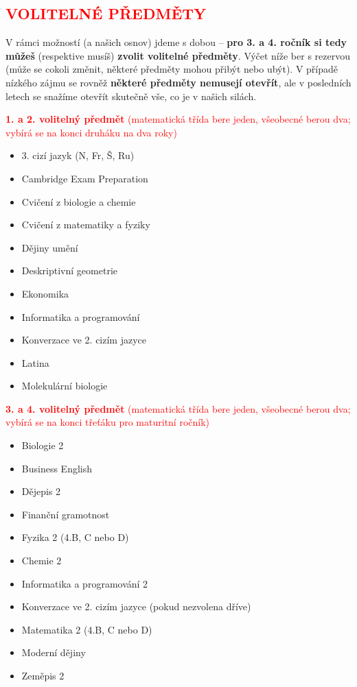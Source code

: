 \documentclass{article}
\newcommand{\podnadpis}[1]{
  \subsection*{\textcolor{red}{#1}}
}
\begin{document}
\newpage

\podnadpis{VOLITELNÉ PŘEDMĚTY}

\noindent V rámci možností (a našich osnov) jdeme s dobou -- \textbf{pro 3. a 4. ročník si tedy
můžeš} (respektive musíš) \textbf{zvolit volitelné předměty}. Výčet níže ber s rezervou
(může se cokoli změnit, některé předměty mohou přibýt nebo ubýt). V případě
nízkého zájmu se rovněž \textbf{některé předměty nemusejí otevřít}, ale v posledních
letech se snažíme otevřít skutečně vše, co je v našich silách.

\begin{multicols}{2}
\noindent \textcolor{red}{\textbf{1. a 2. volitelný předmět} (matematická třída bere jeden, všeobecné berou dva; vybírá se na konci druháku na dva roky)}
  \begin{itemize}
    \item 3. cizí jazyk (N, Fr, Š, Ru)
    \item Cambridge Exam Preparation
    \item Cvičení z biologie a chemie
    \item Cvičení z matematiky a fyziky
    \item Dějiny umění
    \item Deskriptivní geometrie
    \item Ekonomika
    \item Informatika a programování
    \item Konverzace ve 2. cizím jazyce
    \item Latina
    \item Molekulární biologie
  \end{itemize}

  \noindent \textcolor{red}{\textbf{3. a 4. volitelný předmět} (matematická třída bere jeden, všeobecné berou dva; vybírá se na konci třeťáku pro maturitní ročník)}
  \begin{itemize}
    \item Biologie 2
    \item Business English
    \item Dějepis 2
    \item Finanční gramotnost
    \item Fyzika 2 (4.B, C nebo D)
    \item Chemie 2
    \item Informatika a programování 2
    \item Konverzace ve 2. cizím jazyce
    (pokud nezvolena dříve)
    \item Matematika 2 (4.B, C nebo D)
    \item Moderní dějiny
    \item Zeměpis 2
  \end{itemize}


\end{multicols}
\end{document}
